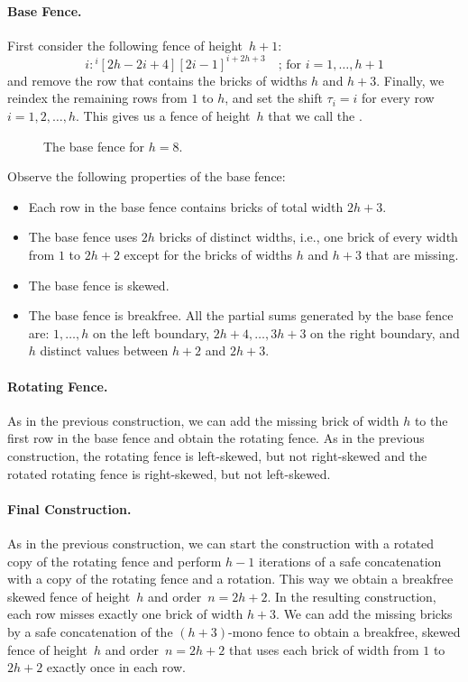 \documentclass[runningheads,envcountsame]{llncs}
\begin{document}
\paragraph{Base Fence.}
First consider the following fence of height~$h+1$:
\begin{equation*}
    i:{}^i[2h-2i+4][2i-1]^{i+2h+3} \quad\text{; for } i=1,\ldots,h+1
\end{equation*}
and remove the row that contains the bricks of widths $h$ and $h+3$.
Finally, we reindex the remaining rows from $1$ to $h$, and set the shift $\tau_i=i$ for every row $i=1,2,\ldots,h$.
This gives us a fence of height~$h$ that we call the .
\begin{figure}[ht]
    \centering
    \caption{The base fence for $h=8$.}
    \label{fig:barrycade_base_fence}
\end{figure}

Observe the following properties of the base fence:
\begin{itemize}
    \item Each row in the base fence contains bricks of total width \(2h+3\).
    \item The base fence uses $2h$ bricks of distinct widths, i.e., one brick of every width from $1$ to $2h+2$ except for the bricks of widths $h$ and $h+3$ that are missing.
    \item The base fence is skewed.
    \item The base fence is breakfree. All the partial sums generated by the base fence are: $1,\ldots,h$ on the left boundary, $2h+4,\ldots,3h+3$ on the right boundary, and $h$ distinct values between $h+2$ and $2h+3$.
\end{itemize}

\paragraph{Rotating Fence.}
As in the previous construction, we can add the missing brick of width $h$ to the first row in the base fence and obtain the rotating fence.
As in the previous construction, the rotating fence is left-skewed, but not right-skewed and the rotated rotating fence is right-skewed, but not left-skewed.

\paragraph{Final Construction.}
As in the previous construction, we can start the construction with a rotated copy of the rotating fence and perform $h-1$ iterations of a safe concatenation with a copy of the rotating fence and a rotation.
This way we obtain a breakfree skewed fence of height~$h$ and order~$n=2h+2$.
In the resulting construction, each row misses exactly one brick of width $h+3$.
We can add the missing bricks by a safe concatenation of the $(h+3)$-mono fence to obtain a breakfree, skewed fence of height~$h$ and order~$n=2h+2$ that uses each brick of width from $1$ to $2h+2$ exactly once in each row.
\end{document}
